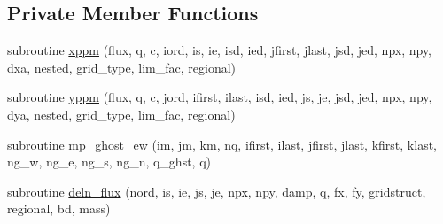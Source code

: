 \subsection*{Private Member Functions}
\begin{DoxyCompactItemize}
\item 
subroutine \hyperlink{classtp__core__mod_a7ec727af882851e702692aaaad20d434}{xppm} (flux, q, c, iord, is, ie, isd, ied, jfirst, jlast, jsd, jed, npx, npy, dxa, nested, grid\-\_\-type, lim\-\_\-fac, regional)
\item 
subroutine \hyperlink{classtp__core__mod_a9073439bc45fc6fbce10103b11db0951}{yppm} (flux, q, c, jord, ifirst, ilast, isd, ied, js, je, jsd, jed, npx, npy, dya, nested, grid\-\_\-type, lim\-\_\-fac, regional)
\item 
subroutine \hyperlink{classtp__core__mod_a58585827528851ef8b46a3e4ca3a0bea}{mp\-\_\-ghost\-\_\-ew} (im, jm, km, nq, ifirst, ilast, jfirst, jlast, kfirst, klast, ng\-\_\-w, ng\-\_\-e, ng\-\_\-s, ng\-\_\-n, q\-\_\-ghst, q)
\item 
subroutine \hyperlink{classtp__core__mod_ae78fe02f1372d88fede1c00f6ae3567c}{deln\-\_\-flux} (nord, is, ie, js, je, npx, npy, damp, q, fx, fy, gridstruct, regional, bd, mass)
\end{DoxyCompactItemize}
